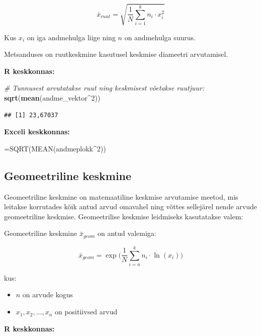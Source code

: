 \documentclass[
]{book}
\newenvironment{Shaded}{\begin{snugshade}}{\end{snugshade}}
\newcommand{\CommentTok}[1]{\textcolor[rgb]{0.56,0.35,0.01}{\textit{#1}}}
\newcommand{\DecValTok}[1]{\textcolor[rgb]{0.00,0.00,0.81}{#1}}
\newcommand{\FunctionTok}[1]{\textcolor[rgb]{0.13,0.29,0.53}{\textbf{#1}}}
\newcommand{\NormalTok}[1]{#1}
\newcommand{\SpecialCharTok}[1]{\textcolor[rgb]{0.81,0.36,0.00}{\textbf{#1}}}
\providecommand{\tightlist}{%
  \setlength{\itemsep}{0pt}\setlength{\parskip}{0pt}}
\renewenvironment{Shaded} {\begin{snugshade}\footnotesize} {\end{snugshade}}
\begin{document}
\[ \bar x_{ruut}=\sqrt{\frac{1}{N}\sum_{i=1}^{k}n_i \cdot x_i^2} \]

Kus \(x_{i}\) on iga andmehulga liige ning \(n\) on andmehulga suurus.

Metsanduses on ruutkeskmine kasutusel keskmise diameetri arvutamisel.

\textbf{R keskkonnas:}

\begin{Shaded}
\begin{Highlighting}[]
\CommentTok{\# Tunnusest arvutatakse ruut ning keskmisest võetakse ruutjuur:}
\FunctionTok{sqrt}\NormalTok{(}\FunctionTok{mean}\NormalTok{(andme\_vektor}\SpecialCharTok{\^{}}\DecValTok{2}\NormalTok{))}
\end{Highlighting}
\end{Shaded}

\begin{verbatim}
## [1] 23,67037
\end{verbatim}

\textbf{Exceli keskkonnas:}

\begin{Shaded}
\begin{Highlighting}[]
\NormalTok{=SQRT(MEAN(andmeplokk\^{}2))}
\end{Highlighting}
\end{Shaded}

\subsection{Geomeetriline keskmine}\label{geomeetriline-keskmine}

Geomeetriline keskmine on matemaatiline keskmise arvutamise meetod, mis leitakse korrutades kõik antud arvud omavahel ning võttes sellejärel nende arvude geomeetriline keskmise. Geomeetrilise keskmise leidmiseks kasutatakse valem:

Geomeetriline keskmine \(\bar x_{geom}\) on antud valemiga:

\[\bar x_{geom}=\exp \biggl( \frac{1}{N}\sum_{i=n}^k n_i \cdot \ln(x_i) \biggr) \]

kus:

\begin{itemize}
\tightlist
\item
  \(n\) on arvude kogus
\item
  \(x_1, x_2, \ldots, x_n\) on positiivsed arvud
\end{itemize}

\textbf{R keskkonnas:}
\end{document}

